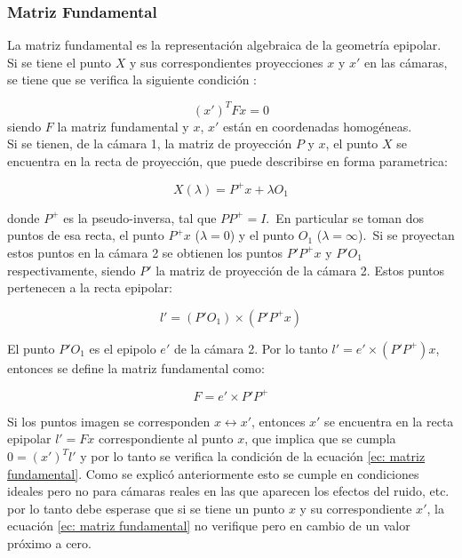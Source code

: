 \subsubsection{Matriz Fundamental}

La matriz fundamental es la representación algebraica de la geometría epipolar. Si se tiene el punto $X$ y sus correspondientes proyecciones $x$ y $x'$ en las cámaras, se tiene que se verifica la siguiente condición :

\begin{equation}
(x')^T F x = 0
\label{ec: matriz fundamental}
\end{equation}
siendo  $F$ la matriz fundamental y $x$, $x'$ están en coordenadas homogéneas.\\

Si se tienen, de la cámara 1, la matriz de proyección $P$ y $x$, el punto $X$ se encuentra en la recta de proyección, que puede describirse en forma parametrica:

\begin{equation}
	X(\lambda) = P^+x+\lambda O_1
\end{equation}

donde $P^+$ es la pseudo-inversa, tal que $PP^+=I$.\
En particular se toman dos puntos de esa recta, el punto $P^+x$ ($\lambda = 0$) y el punto $O_1$ ($\lambda = \infty$).\
Si se proyectan estos puntos en la cámara 2 se obtienen los puntos $P'P^+x$ y $P'O_1$ respectivamente, siendo $P'$ la matriz de proyección de la cámara 2. Estos puntos pertenecen a la recta epipolar:

\begin{equation}
l' = (P'O_1) \times (P'P^+ x)
\end{equation}

El punto $P'O_1$ es el epipolo $e'$ de la cámara 2. Por lo tanto $l' = e' \times (P'P^+) x$, entonces se define la matriz fundamental como:

\begin{equation}
F=e' \times P'P^+
\end{equation}

Si los puntos imagen se corresponden $x \leftrightarrow x'$, entonces $x'$ se encuentra en la recta epipolar $l'=Fx$ correspondiente al punto $x$, que implica que se cumpla $0=(x')^Tl'$ y por lo tanto se verifica la condición de la ecuación \ref{ec: matriz fundamental}. Como se explicó anteriormente esto se cumple en condiciones ideales pero no para cámaras reales en las que aparecen los efectos del ruido, etc. por lo tanto debe esperase que si se tiene un punto $x$ y su correspondiente $x'$, la ecuación \ref{ec: matriz fundamental} no verifique pero en cambio de un valor próximo a cero.\\

